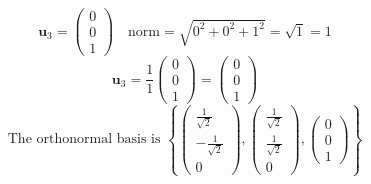 \documentclass[a3paper,12pt]{extarticle} %
\begin{document}
\begin{enumerate}
\begin{enumerate}
\[            \mathbf{u}_3 = \begin{pmatrix} 0 \\ 0 \\ 1 \end{pmatrix} \quad \text{norm} = \sqrt{0^2 + 0^2 + 1^2} = \sqrt{1} = 1
        \]
        \[
            \mathbf{u}_3 = \frac{1}{1} \begin{pmatrix} 0 \\ 0 \\ 1 \end{pmatrix} = \begin{pmatrix} 0 \\ 0 \\ 1 \end{pmatrix}
        \]
        \[
            \text{The orthonormal basis is } \left\{ \begin{pmatrix} \frac{1}{\sqrt{2}} \\ -\frac{1}{\sqrt{2}} \\ 0 \end{pmatrix}, \begin{pmatrix} \frac{1}{\sqrt{2}} \\ \frac{1}{\sqrt{2}} \\ 0 \end{pmatrix}, \begin{pmatrix} 0 \\ 0 \\ 1 \end{pmatrix} \right\}
        \]
    \end{enumerate}
\end{enumerate}
\end{document}
